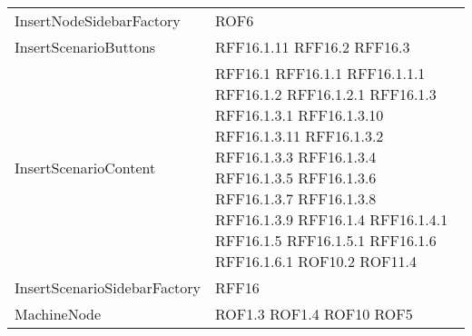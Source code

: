 \begin{longtable}{p{5cm}!{\VRule[1pt]}p{2.5cm}}
	InsertNodeSidebarFactory & ROF6\\
	InsertScenarioButtons & RFF16.1.11 \newline RFF16.2 \newline RFF16.3\\
	InsertScenarioContent & RFF16.1 \newline RFF16.1.1 \newline RFF16.1.1.1 \newline RFF16.1.2 \newline RFF16.1.2.1 \newline RFF16.1.3 \newline RFF16.1.3.1 \newline RFF16.1.3.10 \newline RFF16.1.3.11 \newline RFF16.1.3.2 \newline RFF16.1.3.3 \newline RFF16.1.3.4 \newline RFF16.1.3.5 \newline RFF16.1.3.6 \newline RFF16.1.3.7 \newline RFF16.1.3.8 \newline RFF16.1.3.9 \newline RFF16.1.4 \newline RFF16.1.4.1 \newline RFF16.1.5 \newline RFF16.1.5.1 \newline RFF16.1.6 \newline RFF16.1.6.1 \newline ROF10.2 \newline ROF11.4\\
	InsertScenarioSidebarFactory & RFF16\\
	MachineNode & ROF1.3 \newline ROF1.4 \newline ROF10 \newline ROF5\\

\end{longtable}
